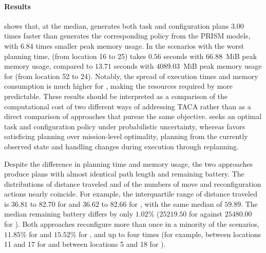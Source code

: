 \paragraph{Results}
 shows that, at the median, \planta generates both task and configuration plans $3.00$ times faster than \CamaraApproach generates the corresponding policy from the PRISM models, with $6.84$ times smaller peak memory usage. In the scenarios with the worst planning time, \planta (from location 16 to 25) takes $0.56$ seconds with $66.88$~MiB peak memory usage, compared to $13.71$ seconds with $4089.03$~MiB peak memory usage for \CamaraApproach (from location 52 to 24). Notably, the spread of execution times and memory consumption is much higher for \CamaraApproach, making the resources required by \planta more predictable. These results should be interpreted as a comparison of the computational cost of two different ways of addressing TACA rather than as a direct comparison of approaches that pursue the same objective. \CamaraApproach seeks an optimal task and configuration policy under probabilistic uncertainty, whereas \planta favors satisficing planning over mission-level optimality, planning from the currently observed state and handling changes during execution through replanning. %

Despite the difference in planning time and memory usage, the two approaches produce plans with almost identical path length and remaining battery. The distributions of distance traveled and of the numbers of move and reconfiguration actions nearly coincide. For example, the interquartile range of distance traveled is $36.81$ to $82.70$ for \planta and $36.62$ to $82.66$ for \CamaraApproach, with the same median of $59.89$. The median remaining battery differs by only $1.02\%$ ($25219.50$ for \planta against $25480.00$ for \CamaraApproach). Both approaches reconfigure more than once in a minority of the scenarios, $11.85\%$ for \planta and $15.52\%$ for \CamaraApproach, and up to four times (for example, between locations 11 and 17 for \planta and between locations 5 and 18 for \CamaraApproach). %

